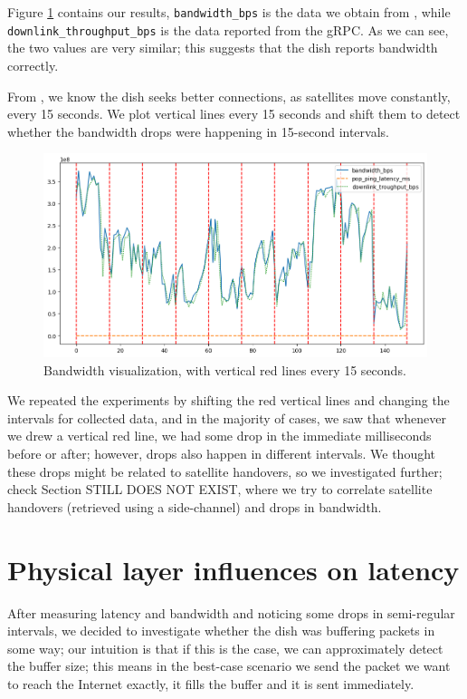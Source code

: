 \documentclass[IN,11pt,twoside,openright,idp,english]{tumthesis}
\begin{document}
Figure \ref{fig:vis-bw-15sec} contains our results, \texttt{bandwidth\_bps} is the data we obtain from , while \texttt{downlink\_throughput\_bps} is the data reported from the gRPC. As we can see, the two values are very similar; this suggests that the dish reports bandwidth correctly.

From \cite{llc-application}, we know the dish seeks better connections, as satellites move constantly, every 15 seconds. We plot vertical lines every 15 seconds and shift them to detect whether the bandwidth drops were happening in 15-second intervals.

\begin{figure}
    \centering
    \includegraphics[width=1.0\columnwidth]{img/bw-15seconds.png}
    \caption{Bandwidth visualization, with vertical red lines every 15 seconds.}
    \label{fig:vis-bw-15sec}
\end{figure}

We repeated the experiments by shifting the red vertical lines and changing the intervals for collected data, and in the majority of cases, we saw that whenever we drew a vertical red line, we had some drop in the immediate milliseconds before or after; however, drops also happen in different intervals. We thought these drops might be related to satellite handovers, so we investigated further; check Section STILL DOES NOT EXIST, where we try to correlate satellite handovers (retrieved using a side-channel) and drops in bandwidth. 

\section{Physical layer influences on latency}

After measuring latency and bandwidth and noticing some drops in semi-regular intervals, we decided to investigate whether the dish was buffering packets in some way; our intuition is that if this is the case, we can approximately detect the buffer size; this means in the best-case scenario we send the packet we want to reach the Internet exactly, it fills the buffer and it is sent immediately.
\end{document}
